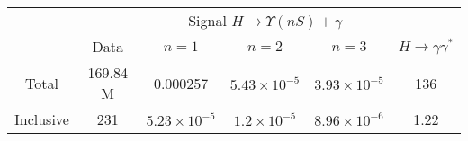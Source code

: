 

\begin{tabular}{c|c|c|c|c|c}
\hline
\hline

&  &  \multicolumn{3}{c|}{Signal $H \rightarrow \Upsilon(nS)+\gamma$} &    \\
\cline{3-5}
& Data & $n=1$ & $n=2$ & $n=3$ &  $H \rightarrow \gamma\gamma^{*}$  \\
\hline
Total & 169.84 M &  0.000257 & $5.43 \times 10^{-5}$ & $3.93 \times 10^{-5}$ & 136  \\
\hline\hline
Inclusive & 231  &  $5.23 \times 10^{-5}$ &  $1.2 \times 10^{-5}$ &  $8.96 \times 10^{-6}$ &  1.22  \\

\end{tabular}

